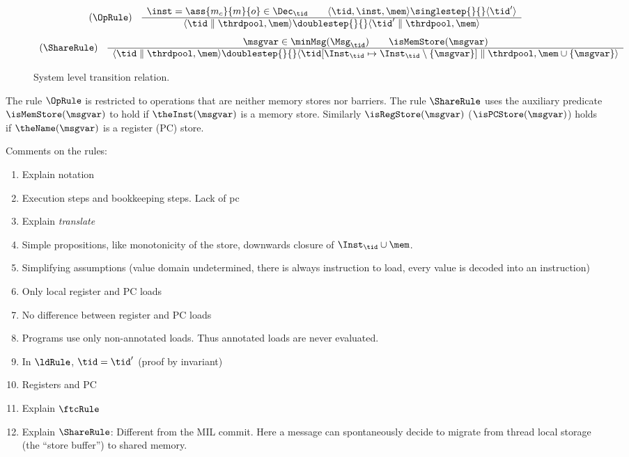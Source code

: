
\begin{figure}
%
\[
\begin{array}{cc}
(\OpRule)
&
\begin{array}{c}
\inst = \ass{m_c}{m}{o}\in\Dec_\tid \qquad
\langle \tid,\inst,\mem\rangle \singlestep{}{} \langle\tid'\rangle \\ \hline
\langle \tid\parallel\thrdpool,\mem\rangle \doublestep{}{}
\langle \tid'\parallel \thrdpool,\mem\rangle
\end{array}
\end{array}
\]
%
\[
\begin{array}{cc}
(\ShareRule)
&
\begin{array}{c}
\msgvar \in \minMsg(\Msg_\tid) \qquad \isMemStore(\msgvar)  \\ \hline
\langle \tid\parallel\thrdpool,\mem\rangle \doublestep{}{}
\langle \tid[\Inst_\tid\mapsto\Inst_\tid\setminus\{\msgvar\}]\parallel\thrdpool,\mem\cup\{\msgvar\}\rangle
\end{array}
\end{array}
\]
\caption{System level transition relation.}
\label{fig:SystemTransitions}
\end{figure}
%
The rule $\OpRule$ is restricted to operations that are neither memory stores nor barriers.
 The rule $\ShareRule$ uses the auxiliary predicate $\isMemStore(\msgvar)$ to hold if $\theInst(\msgvar)$ is a memory store. Similarly
$\isRegStore(\msgvar)$ ($\isPCStore(\msgvar)$) holds if $\theName(\msgvar)$ is a register (PC) store.

Comments on the rules:
%
\begin{enumerate}
\item Explain notation
\item Execution steps and bookkeeping steps. Lack of pc
\item Explain \emph{translate}
\item Simple propositions, like monotonicity of the store, downwards closure of $\Inst_{\tid}\cup\mem$.
\item Simplifying assumptions (value domain undetermined, there is always instruction to load, every value is decoded into an instruction)
\item Only local register and PC loads
\item No difference between register and PC loads
\item Programs use only non-annotated loads. Thus annotated loads are never evaluated.
\item In $\ldRule$, $\tid=\tid'$ (proof by invariant)
\item Registers and PC
\item Explain $\ftcRule$
\item Explain $\ShareRule$: Different from the MIL commit. Here a message
can spontaneously decide to migrate from thread local storage (the ``store buffer'') to shared memory.
\end{enumerate}

